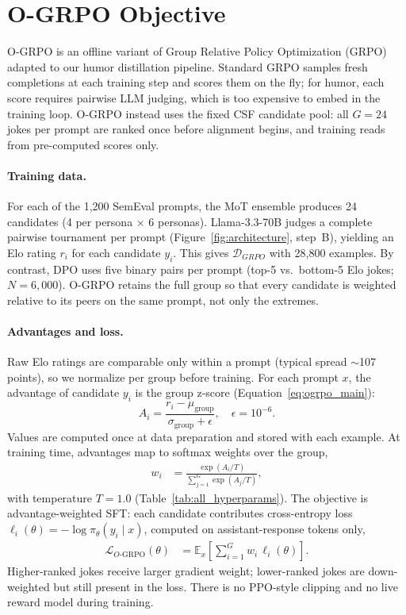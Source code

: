 \documentclass[11pt]{article}
\begin{document}
\section{O-GRPO Objective}
\label{sec:appendix_ogrpo}

O-GRPO is an offline variant of Group Relative Policy Optimization (GRPO)~\cite{shao2024deepseekmath} adapted to our humor distillation pipeline. Standard GRPO samples fresh completions at each training step and scores them on the fly; for humor, each score requires pairwise LLM judging, which is too expensive to embed in the training loop. O-GRPO instead uses the fixed CSF candidate pool: all $G{=}24$ jokes per prompt are ranked once before alignment begins, and training reads from pre-computed scores only.

\paragraph{Training data.}
For each of the 1,200 SemEval prompts, the MoT ensemble produces 24 candidates (4 per persona $\times$ 6 personas). Llama-3.3-70B judges a complete pairwise tournament per prompt (Figure~\ref{fig:architecture}, step~B), yielding an Elo rating $r_i$ for each candidate $y_i$. This gives $\mathcal{D}_{GRPO}$ with 28,800 examples. By contrast, DPO uses five binary pairs per prompt (top-5 vs.\ bottom-5 Elo jokes; $N{=}6{,}000$). O-GRPO retains the full group so that every candidate is weighted relative to its peers on the same prompt, not only the extremes.

\paragraph{Advantages and loss.}
Raw Elo ratings are comparable only within a prompt (typical spread $\sim$107 points), so we normalize per group before training. For each prompt $x$, the advantage of candidate $y_i$ is the group z-score (Equation~\eqref{eq:ogrpo_main}):
\begin{equation}
A_i = \frac{r_i - \mu_{\mathrm{group}}}{\sigma_{\mathrm{group}} + \epsilon}, \quad \epsilon = 10^{-6}.
\end{equation}
Values are computed once at data preparation and stored with each example. At training time, advantages map to softmax weights over the group,
\begin{align}
\label{eq:ogrpo_weights}
 w_i &= \frac{\exp(A_i / T)}{\sum_{j=1}^{G}\exp(A_j / T)},
\end{align}
with temperature $T{=}1.0$ (Table~\ref{tab:all_hyperparams}). The objective is advantage-weighted SFT: each candidate contributes cross-entropy loss $\ell_i(\theta) = -\log \pi_\theta(y_i \mid x)$, computed on assistant-response tokens only,
\begin{align}
\label{eq:ogrpo_loss}
 \mathcal{L}_{O\text{-GRPO}}(\theta) &= \mathbb{E}_{x}\!\left[\sum_{i=1}^{G} w_i \,\ell_i(\theta)\right].
\end{align}
Higher-ranked jokes receive larger gradient weight; lower-ranked jokes are down-weighted but still present in the loss. There is no PPO-style clipping and no live reward model during training.
\end{document}
